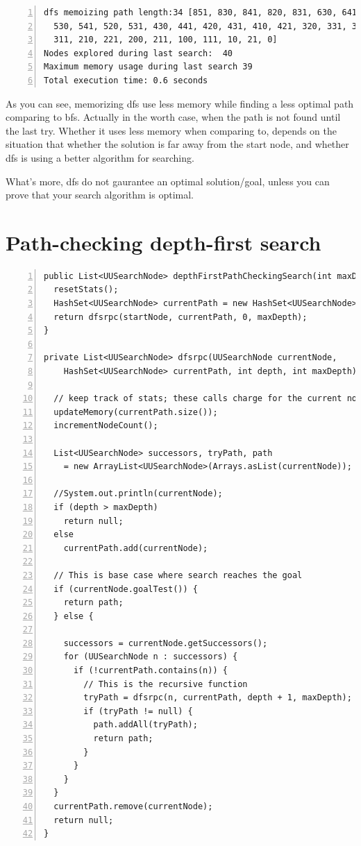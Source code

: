 \documentclass{article}
\begin{document}
\begin{lstlisting}[numbers=left]
dfs memoizing path length:34 [851, 830, 841, 820, 831, 630, 641, 540, 551,
  530, 541, 520, 531, 430, 441, 420, 431, 410, 421, 320, 331, 310, 321, 300,
  311, 210, 221, 200, 211, 100, 111, 10, 21, 0]
Nodes explored during last search:  40
Maximum memory usage during last search 39
Total execution time: 0.6 seconds
\end{lstlisting}

As you can see, memorizing dfs use less memory while finding a less optimal path comparing to bfs. Actually in the worth case, when the path is not found until the last try. Whether it uses less memory when comparing to, depends on the situation that whether the solution is far away from the start node, and whether dfs is using a better algorithm for searching. 

What's more, dfs do not gaurantee an optimal solution/goal, unless you can prove that your search algorithm is optimal. 















\section{Path-checking depth-first search}

\begin{lstlisting}[numbers=left]
public List<UUSearchNode> depthFirstPathCheckingSearch(int maxDepth) {
  resetStats();
  HashSet<UUSearchNode> currentPath = new HashSet<UUSearchNode>();
  return dfsrpc(startNode, currentPath, 0, maxDepth);
}

private List<UUSearchNode> dfsrpc(UUSearchNode currentNode,
    HashSet<UUSearchNode> currentPath, int depth, int maxDepth) {

  // keep track of stats; these calls charge for the current node
  updateMemory(currentPath.size());
  incrementNodeCount();

  List<UUSearchNode> successors, tryPath, path 
  	= new ArrayList<UUSearchNode>(Arrays.asList(currentNode));

  //System.out.println(currentNode);
  if (depth > maxDepth)
    return null;
  else 
    currentPath.add(currentNode);

  // This is base case where search reaches the goal
  if (currentNode.goalTest()) {
    return path;
  } else {
  
    successors = currentNode.getSuccessors();
    for (UUSearchNode n : successors) {
      if (!currentPath.contains(n)) {
        // This is the recursive function
        tryPath = dfsrpc(n, currentPath, depth + 1, maxDepth);
        if (tryPath != null) {
          path.addAll(tryPath);
          return path;
        }
      }
    }
  }
  currentPath.remove(currentNode);
  return null;
}
\end{lstlisting}
\end{document}

